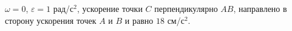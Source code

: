 $\omega=0$, $\varepsilon=1$ рад/с$^2$, ускорение точки $C$
перпендикулярно $AB$, направлено в сторону ускорения точек $A$ и $B$
и равно $18$ см/с$^2$.
